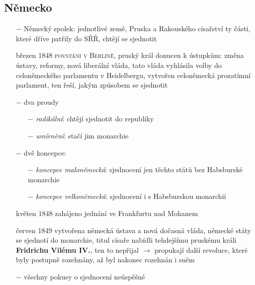 \documentclass{article}
\begin{document}
\subsection*{Německo}
\begin{itemize}
    \vspace{-0.5em}
    \setlength\itemsep{0.15em}
    \item[$-$] Německý spolek: jednotlivé země, Pruska a Rakouského císařství ty části, které dříve patřily do SŘŘ, chtějí se sjednotit
    \item[březen 1848] \textsc{povstání v Berlíně}, pruský král donucen k ústupkům: změna ústavy, reformy, nová liberální vláda, tato vláda vyhlásila volby do celoněmeckého parlamentu v Heidelbergu, vytvořen celoněmecká prozatímní parlament, ten řeší, jakým způsobem se sjednotit
    \item[$-$] dva proudy
    \begin{itemize}
        \vspace{-0.5em}
        \setlength\itemsep{0.15em}
        \item[$-$] \textit{radikální}: chtějí sjednotit do republiky
        \item[$-$] \textit{umírnění}: stačí jim monarchie

    \end{itemize}
    \item[$-$] dvě koncepce:
    \begin{itemize}
        \vspace{-0.5em}
        \setlength\itemsep{0.15em}
        \item[$-$] \textit{koncepce maloněmecká}: sjednocení jen těchto států bez Habsburské monarchie
        \item[$-$] \textit{koncepce velkoněmecká}: sjednocení i s Habsburskou monarchií
    \end{itemize}
    \item[květen 1848] zahájeno jednání ve Frankfurtu nad Mohanem
    \item[červen 1849] vytvořena německá ústava a nová dočasná vláda, německé státy se sjednotí do monarchie, titul císaře nabídli tehdejšímu pruskému králi \textbf{Fridrichu Vilému IV.}, ten to nepřijal $\rightarrow$ propukají další revoluce, které byly postupně rozehnány, až byl nakonec rozehnán i sněm
    \item[$-$] všechny pokusy o sjednocení neúspěšné 
\end{itemize}
\end{document}

